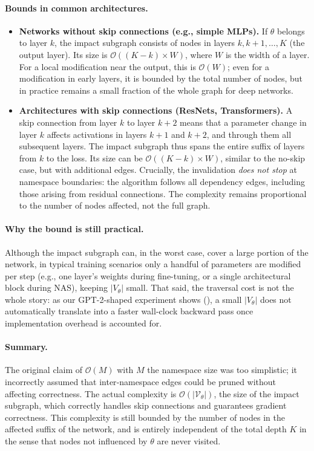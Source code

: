 \documentclass{article}
\begin{document}
\paragraph{Bounds in common architectures.}
\begin{itemize}
    \item \textbf{Networks without skip connections (e.g., simple MLPs).} If $\theta$ belongs to layer $k$, the impact subgraph consists of nodes in layers $k, k+1, \dots, K$ (the output layer). Its size is $\mathcal{O}((K-k) \times W)$, where $W$ is the width of a layer. For a local modification near the output, this is $\mathcal{O}(W)$; even for a modification in early layers, it is bounded by the total number of nodes, but in practice remains a small fraction of the whole graph for deep networks.
    \item \textbf{Architectures with skip connections (ResNets, Transformers).} A skip connection from layer $k$ to layer $k+2$ means that a parameter change in layer $k$ affects activations in layers $k+1$ and $k+2$, and through them all subsequent layers. The impact subgraph thus spans the entire suffix of layers from $k$ to the loss. Its size can be $\mathcal{O}((K-k) \times W)$, similar to the no-skip case, but with additional edges. Crucially, the invalidation \emph{does not stop} at namespace boundaries: the algorithm follows all dependency edges, including those arising from residual connections. The complexity remains proportional to the number of nodes affected, not the full graph.
\end{itemize}

\paragraph{Why the bound is still practical.}
Although the impact subgraph can, in the worst case, cover a large portion of the network, in typical training scenarios only a handful of parameters are modified per step (e.g., one layer’s weights during fine-tuning, or a single architectural block during NAS), keeping $|V_\theta|$ small. That said, the traversal cost is not the whole story: as our GPT-2-shaped experiment shows (), a small $|V_\theta|$ does not automatically translate into a faster wall-clock backward pass once implementation overhead is accounted for.

\paragraph{Summary.}
The original claim of $\mathcal{O}(M)$ with $M$ the namespace size was too simplistic; it incorrectly assumed that inter‑namespace edges could be pruned without affecting correctness. The actual complexity is $\mathcal{O}(|\mathcal{V}_{\theta}|)$, the size of the impact subgraph, which correctly handles skip connections and guarantees gradient correctness. This complexity is still bounded by the number of nodes in the affected suffix of the network, and is entirely independent of the total depth $K$ in the sense that nodes not influenced by $\theta$ are never visited.
\end{document}
